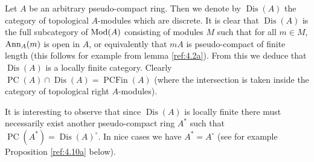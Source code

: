 \documentclass{amsproc}
\DeclareMathOperator{\Dis}{Dis}
\def\Ann{\mathop{\text{Ann}}\nolimits}
\def\Mod{\mathop{\text{Mod}}}
\let\oldtext\text
\def\text#1{\oldtext{\upshape #1}}
\DeclareMathOperator{\PC}{PC}
\DeclareMathOperator{\PCFin}{PCFin}
\theoremstyle{definition}
\theoremstyle{remark}
\numberwithin{equation}{section}
\numberwithin{table}{section}
\numberwithin{figure}{section}
\begin{document}
Let $A$ be an arbitrary pseudo-compact ring. Then we denote by $\Dis(A)$
the category of topological $A$-modules which are discrete. It is
clear that $\Dis(A)$ is the  full subcategory of $\Mod(A)$ consisting of
modules $M$ such that for all $m\in M$, $\Ann_A(m)$ is open 
in $A$, or equivalently that $mA$ is
pseudo-compact of finite length (this follows for example from lemma
\ref{ref:4.2a}). From this we deduce
that $\Dis(A)$ is a locally finite category. Clearly $\PC(A)\cap
\Dis(A)=
\PCFin(A)$  (where the intersection is taken
inside the category of topological right $A$-modules).

 

It is interesting to observe that since $\Dis(A)$ is locally finite there
must necessarily exist another pseudo-compact ring $A^\ast$ such that
$\PC(A^\ast)=\Dis(A)^\circ$. In nice cases we have $A^\ast=A^\circ$ (see 
for example Proposition \ref{ref:4.10a} below).
\end{document}

